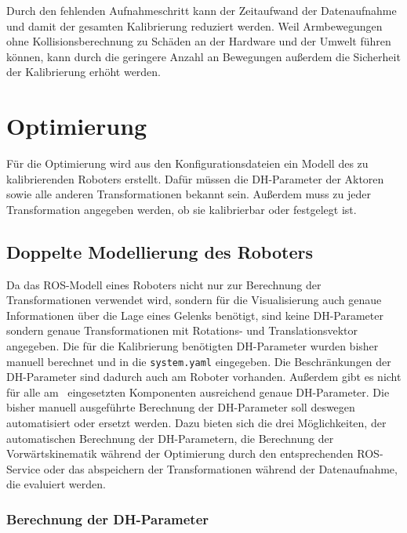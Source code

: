 Durch den fehlenden Aufnahmeschritt kann der Zeitaufwand der Datenaufnahme 
und damit der gesamten Kalibrierung reduziert werden.
Weil Armbewegungen ohne Kollisionsberechnung zu Schäden an der Hardware und der
Umwelt führen können, kann durch die geringere Anzahl an Bewegungen außerdem 
die Sicherheit der Kalibrierung erhöht werden.



\section{Optimierung} %

\label{sec:Optimierung}

Für die Optimierung wird aus den Konfigurationsdateien ein Modell des zu 
kalibrierenden Roboters erstellt. Dafür müssen die \ac{DH-Parameter} der Aktoren
sowie alle anderen Transformationen bekannt sein. Außerdem muss zu jeder Transformation 
angegeben werden, ob sie kalibrierbar oder festgelegt ist.

\subsection{Doppelte Modellierung des Roboters} %
\label{sub:doppelte modellierung}


Da das \ac{ROS}-Modell eines 
Roboters nicht nur zur Berechnung der Transformationen verwendet wird, sondern für die Visualisierung auch genaue
Informationen über die Lage eines Gelenks benötigt, sind keine \ac{DH-Parameter} sondern
genaue Transformationen mit Rotations- und Translationsvektor angegeben. Die für die
Kalibrierung benötigten \ac{DH-Parameter} wurden bisher manuell berechnet und
in die \texttt{system.yaml} eingegeben. Die Beschränkungen der \ac{DH-Parameter}
sind dadurch auch am Roboter vorhanden. Außerdem gibt es nicht für alle am \cob\ 
eingesetzten Komponenten ausreichend genaue \ac{DH-Parameter}. Die bisher manuell
ausgeführte Berechnung der \ac{DH-Parameter} soll deswegen automatisiert oder
ersetzt werden. Dazu bieten sich die drei Möglichkeiten, der automatischen 
Berechnung der \ac{DH-Parameter}n, die Berechnung der Vorwärtskinematik während
der Optimierung durch den entsprechenden \ac{ROS}-Service oder das abspeichern 
der Transformationen während der Datenaufnahme, die evaluiert werden. 




\subsubsection{Berechnung der \ac{DH-Parameter}} %

